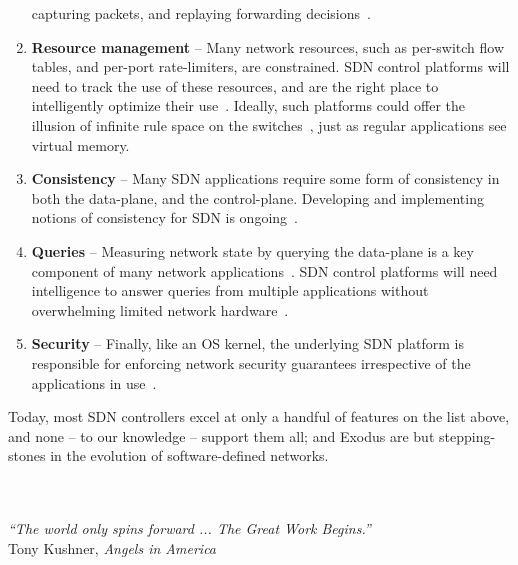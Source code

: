 \begin{enumerate}
capturing packets, and replaying forwarding decisions~\cite{packet_history, of_replay}.
\item {\bf Resource management} -- Many network resources, such as per-switch flow tables,
and per-port rate-limiters, are constrained. SDN control platforms will need to track the use of these
resources, and are the right place to intelligently optimize their use~\cite{Curtis:2011,Yu:2010,Kang:2013optimizing,Kanizo:2013palette}. Ideally, such platforms
could offer the illusion of infinite rule space on the switches~\cite{naga-cacheflow}, just as regular applications see
virtual memory.
\item {\bf Consistency} -- Many SDN applications require some form of consistency in both the
data-plane, and the control-plane. Developing and implementing notions of consistency for
SDN is ongoing~\cite{reitblatt12consistent,ratul,of.cpp,sdn-transactions}.
\item {\bf Queries} -- Measuring network state by querying the data-plane is a key component of
many network applications~\cite{alfares10hedera,etc}. SDN control platforms will need intelligence to answer
queries from multiple applications without overwhelming limited network hardware~\cite{Rotsos:2012oflops}.
\item{\bf Security} -- Finally, like an OS kernel, the underlying SDN platform is responsible for enforcing
network security guarantees irrespective of the applications in use~\cite{paper_one,paper_two}.
\end{enumerate}

Today, most SDN controllers excel at only a handful of features on the list above, and none -- to our knowledge --
support them all; \sys and Exodus are but stepping-stones in the evolution of software-defined networks.

\ \\
\ \\
{\raggedleft{}
\emph{``The world only spins forward ... The Great Work Begins.''}\\
\hfill Tony Kushner, \emph{Angels in America}
}




